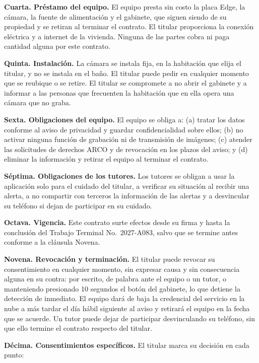 \documentclass[12pt,a4paper,oneside]{book}
\theoremstyle{plain}
\theoremstyle{definition}
\theoremstyle{remark}
\begin{document}
\textbf{Cuarta. Préstamo del equipo.} El equipo presta sin costo la placa Edge, la cámara, la fuente de alimentación y el gabinete, que siguen siendo de su propiedad y se retiran al terminar el contrato. El titular proporciona la conexión eléctrica y a internet de la vivienda. Ninguna de las partes cobra ni paga cantidad alguna por este contrato.

\textbf{Quinta. Instalación.} La cámara se instala fija, en la habitación que elija el titular, y no se instala en el baño. El titular puede pedir en cualquier momento que se reubique o se retire. El titular se compromete a no abrir el gabinete y a informar a las personas que frecuenten la habitación que en ella opera una cámara que no graba.

\textbf{Sexta. Obligaciones del equipo.} El equipo se obliga a: (a) tratar los datos conforme al aviso de privacidad y guardar confidencialidad sobre ellos; (b) no activar ninguna función de grabación ni de transmisión de imágenes; (c) atender las solicitudes de derechos ARCO y de revocación en los plazos del aviso; y (d) eliminar la información y retirar el equipo al terminar el contrato.

\textbf{Séptima. Obligaciones de los tutores.} Los tutores se obligan a usar la aplicación solo para el cuidado del titular, a verificar su situación al recibir una alerta, a no compartir con terceros la información de las alertas y a desvincular su teléfono si dejan de participar en su cuidado.

\textbf{Octava. Vigencia.} Este contrato surte efectos desde su firma y hasta la conclusión del Trabajo Terminal No.~2027-A083, salvo que se termine antes conforme a la cláusula Novena.

\textbf{Novena. Revocación y terminación.} El titular puede revocar su consentimiento en cualquier momento, sin expresar causa y sin consecuencia alguna en su contra: por escrito, de palabra ante el equipo o un tutor, o manteniendo presionado 10 segundos el botón del gabinete, lo que detiene la detección de inmediato. El equipo dará de baja la credencial del servicio en la nube a más tardar el día hábil siguiente al aviso y retirará el equipo en la fecha que se acuerde. Un tutor puede dejar de participar desvinculando su teléfono, sin que ello termine el contrato respecto del titular.

\textbf{Décima. Consentimientos específicos.} El titular marca su decisión en cada punto:
\end{document}
